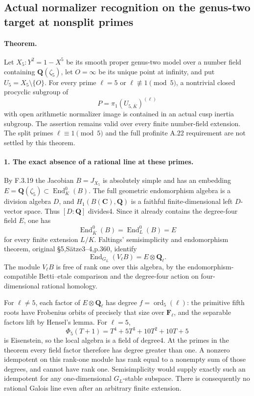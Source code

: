 \subsection*{Actual normalizer recognition on the genus-two target at nonsplit primes}

\paragraph{Theorem.}
Let $X_5:Y^2=1-X^5$ be its smooth proper genus-two model over a
number field containing $\mathbf Q(\zeta_5)$, let $O=\infty$ be its
unique point at infinity, and put $U_5=X_5\setminus\{O\}$.
For every prime $\ell=5$ or $\ell\not\equiv1\pmod5$, a nontrivial
closed procyclic subgroup of
\[
 P=\pi_1(U_{5,\overline K})^{(\ell)}
\]
with open arithmetic normalizer image is contained in an actual
cusp inertia subgroup. The assertion remains valid over every
finite number-field extension. The split primes
$\ell\equiv1\pmod5$ and the full profinite A.22 requirement are
not settled by this theorem.

\paragraph{1. The exact absence of a rational line at these primes.}
By F.3.19 the Jacobian $B=J_{X_5}$ is absolutely simple and has
an embedding $E=\mathbf Q(\zeta_5)\subset\operatorname{End}^0_K(B)$.
The full geometric endomorphism algebra is a division algebra
$D$, and $H_1(B(\mathbf C),\mathbf Q)$ is a faithful finite-dimensional
left $D$-vector space. Thus $[D:\mathbf Q]$ divides4. Since it
already contains the degree-four field $E$, one has
\[
 \operatorname{End}^0_{\overline K}(B)
 =\operatorname{End}^0_L(B)=E
\]
for every finite extension $L/K$.
Faltings' semisimplicity and endomorphism theorem, original
\S5,S\"atze3--4,p.360, identify
\[
 \operatorname{End}_{G_L}(V_\ell B)=E\otimes\mathbf Q_\ell.
\]
The module $V_\ell B$ is free of rank one over this algebra, by
the endomorphism-compatible Betti--etale comparison and the
degree-four action on four-dimensional rational homology.

For $\ell\ne5$, each factor of $E\otimes\mathbf Q_\ell$ has degree
$f=\operatorname{ord}_5(\ell)$: the primitive fifth roots have
Frobenius orbits of precisely that size over $\mathbf F_\ell$,
and the separable factors lift by Hensel's lemma. For $\ell=5$,
\[
 \Phi_5(T+1)=T^4+5T^3+10T^2+10T+5
\]
is Eisenstein, so the local algebra is a field of degree4.
At the primes in the theorem every field factor therefore has
degree greater than one. A nonzero idempotent on this rank-one
module has rank equal to a nonempty sum of those degrees, and
cannot have rank one. Semisimplicity would supply exactly such
an idempotent for any one-dimensional $G_L$-stable subspace.
There is consequently no rational Galois line even after an
arbitrary finite extension.


